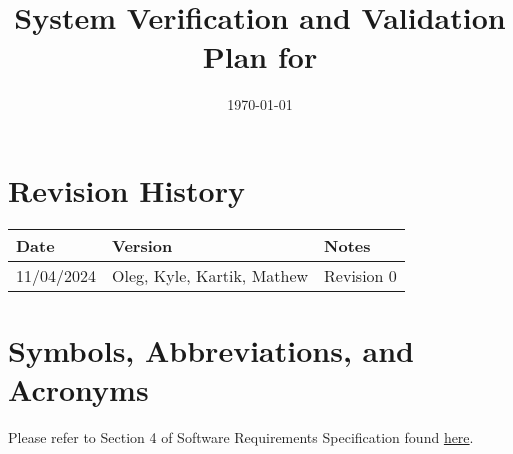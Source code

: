 \documentclass[12pt, titlepage]{article}
\begin{document}
\title{System Verification and Validation Plan for \progname{}} 
\author{\authname}
\date{\today}
	
\maketitle


\section*{Revision History}

\begin{tabularx}{\textwidth}{p{3cm}p{2cm}X}
\toprule {\bf Date} & {\bf Version} & {\bf Notes}\\
\midrule
11/04/2024 & Oleg, Kyle, Kartik, Mathew & Revision 0\\
\bottomrule
\end{tabularx}



\newpage

\tableofcontents

\newpage

\section{Symbols, Abbreviations, and Acronyms}

Please refer to Section 4 of Software Requirements Specification found \href{https://github.com/OKKM-insights/OKKM.insights/blob/main/docs/SRS/SRS.pdf}{here}.
\end{document}
